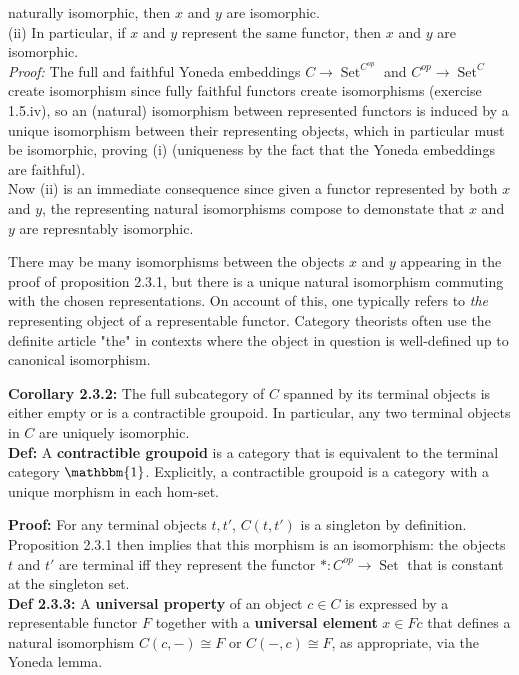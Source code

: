 \documentclass[a4paper]{article}
\DeclareMathOperator{\Set}{Set}
\begin{document}
naturally isomorphic, then $x$ and $y$ are isomorphic.\\
(ii) In particular, if $x$ and $y$ represent the same functor, then $x$ and $y$
are isomorphic.\\
\linebreak
\textit{Proof:} The full and faithful Yoneda embeddings $C\to 
\Set^{C^{op}}$ and
$C^{op} \to \Set^{C}$ create isomorphism since fully faithful functors create
isomorphisms (exercise 1.5.iv), so an (natural) isomorphism between represented
functors is induced by a unique isomorphism between their representing objects,
which in particular must be isomorphic, proving (i) (uniqueness by
the fact that the Yoneda embeddings are faithful).\\
Now (ii) is an immediate consequence since given a functor represented by
both $x$ and $y$, the representing natural isomorphisms compose to demonstate
that $x$ and $y$ are represntably isomorphic.\\
 \linebreak
\begin{center}
    There may be many isomorphisms between the objects $x$ and $y$ appearing in
    the proof of proposition 2.3.1, but there is a unique natural isomorphism
    commuting with the chosen representations. On account of this, one
    typically refers to \textit{the} representing object of a representable
    functor. Category theorists often use the definite article "the" in
    contexts where the object in question is well-defined up to canonical
    isomorphism.
\end{center}
\textbf{Corollary 2.3.2:} The full subcategory of $C$ spanned by its terminal
objects is either empty or is a contractible groupoid. In particular, any two
terminal objects in $C$ are uniquely isomorphic.\\
\textbf{Def:} A \textbf{contractible groupoid} is a category that is equivalent
to the terminal category $\mathbbm{1}$. Explicitly, a contractible groupoid is
a category with a unique morphism in each hom-set.\\
\linebreak

\textbf{Proof:} For any terminal objects $t,t'$,
$C(t,t')$ is a singleton by definition. Proposition 2.3.1 then implies that
this morphism is an isomorphism: the objects $t$ and $t'$ are terminal iff they
represent the functor $*  \colon C^{op} \to \Set$ that is constant at the
singleton set.\\
\linebreak
\textbf{Def 2.3.3:} A \textbf{universal property} of an object $c \in C$ is
expressed by a representable functor $F$ together with a \textbf{universal
element} $x \in Fc$ that defines a natural isomorphism
$C(c, -) \cong F$ or $C(-,c) \cong F$, as appropriate, via the Yoneda lemma.\\
\linebreak
\end{document}
